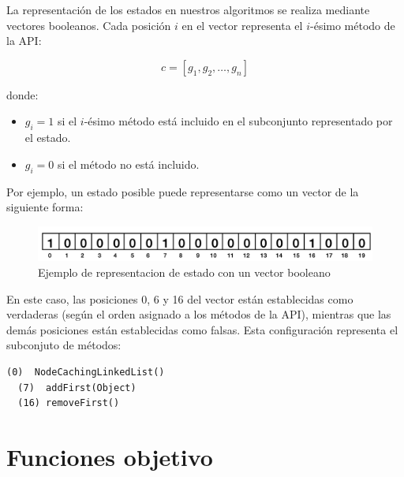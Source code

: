 
La representación de los estados en nuestros algoritmos se realiza mediante vectores booleanos. Cada posición $i$ en el vector representa el $i$-ésimo método de la API:

\[
c = [g_1, g_2, \ldots, g_n]
\]

donde:
\begin{itemize}
    \item $g_i = 1$ si el $i$-ésimo método está incluido en el subconjunto representado por el estado.
    \item $g_i = 0$ si el método no está incluido.
\end{itemize}

Por ejemplo, un estado posible puede representarse como un vector de la siguiente forma:


\begin{figure}[H]
  \centering
  \includegraphics[width=1.0\textwidth]{images/cromosoma.png}
  \caption{Ejemplo de representacion de estado con un vector booleano}
  \label{fig:cromosoma}
\end{figure}

En este caso, las posiciones 0, 6 y 16 del vector están establecidas como verdaderas (según el orden asignado a los métodos de la API), mientras que las demás posiciones están establecidas como falsas. Esta configuración representa el subconjuto de métodos:
\vspace{5pt} 

\begin{lstlisting}[numbers=none,label=fig:NCLnoMin1, caption=Métodos generadores de objetos que representa el cromosoma de la Figura 2, captionpos=b, frame=tb , xleftmargin=0pt, basicstyle=\scriptsize]
  (0)  NodeCachingLinkedList()
  (7)  addFirst(Object)
  (16) removeFirst()
\end{lstlisting}

\section{Funciones objetivo}
\label{sec:fitness}

